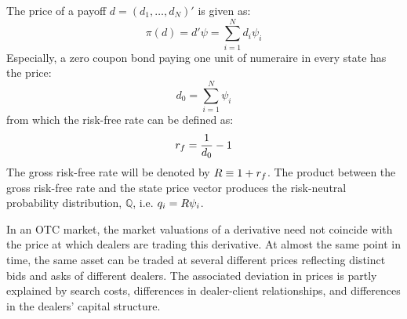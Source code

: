 \documentclass[main.tex]{subfiles}
\begin{document}
        The price of a payoff $d=\left(d_{1}, \dots, d_{N}\right)'$ is given as:
            \begin{equation}
                \pi(d) = d'\psi = \sum_{i=1}^{N} d_{i}\psi_{i}
            \end{equation}
        Especially, a zero coupon bond paying one unit of numeraire in every state has the price:
            \begin{equation}
                d_{0} = \sum_{i=1}^{N} \psi_{i}
            \end{equation}
        from which the risk-free rate can be defined as:
            \begin{equation}
                r_{f} = \frac{1}{d_{0}} - 1
            \end{equation}
        The gross risk-free rate will be denoted by $R \equiv 1 + r_{f}$.
        The product between the gross risk-free rate and the state price vector produces the risk-neutral probability distribution, $\mathbb{Q}$, i.e. $q_{i} = R\psi_{i}$.

        In an OTC market, the market valuations of a derivative need not coincide with the price at which dealers are trading this derivative.
        At almost the same point in time, the same asset can be traded at several different prices reflecting distinct bids and asks of different dealers.
        The associated deviation in prices is partly explained by search costs, differences in dealer-client relationships, and differences in the dealers' capital structure.
\end{document}
